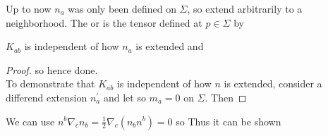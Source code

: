 \documentclass{article}
\begin{document}
\begin{definition}
Up to now $n_a$ was only been defined on $\Sigma$, so extend arbitrarily to a neighborhood. The  or  is the tensor defined at $p\in\Sigma$ by
\end{definition}

\begin{lemma}
$K_{ab}$ is independent of how $n_a$ is extended and 
\end{lemma}
\begin{proof}
so 
hence done. \\
To demonstrate that $K_{ab}$ is independent of how $n$ is extended, consider a differend extension $n_a^\prime$ and let 
so $m_a=0$ on $\Sigma$. Then 
\end{proof}
We can use $n^b\nabla_c n_b = \frac{1}{2} \nabla_c (n_b n^b) = 0 $ so 
Thus it can be shown 
\end{document}
